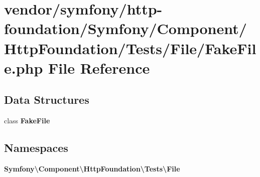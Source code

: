 \section{vendor/symfony/http-\/foundation/\+Symfony/\+Component/\+Http\+Foundation/\+Tests/\+File/\+Fake\+File.php File Reference}
\label{_fake_file_8php}
\subsection*{Data Structures}
\begin{DoxyCompactItemize}
\item 
class {\bf Fake\+File}
\end{DoxyCompactItemize}
\subsection*{Namespaces}
\begin{DoxyCompactItemize}
\item 
 {\bf Symfony\textbackslash{}\+Component\textbackslash{}\+Http\+Foundation\textbackslash{}\+Tests\textbackslash{}\+File}
\end{DoxyCompactItemize}
